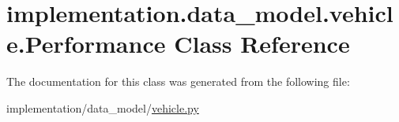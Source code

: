 \hypertarget{classimplementation_1_1data__model_1_1vehicle_1_1_performance}{}\section{implementation.\+data\+\_\+model.\+vehicle.\+Performance Class Reference}
\label{classimplementation_1_1data__model_1_1vehicle_1_1_performance}


The documentation for this class was generated from the following file\+:\begin{DoxyCompactItemize}
\item 
implementation/data\+\_\+model/\hyperlink{vehicle_8py}{vehicle.\+py}\end{DoxyCompactItemize}
